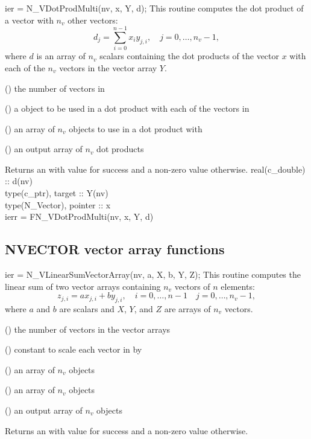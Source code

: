 {
  ier = N\_VDotProdMulti(nv, x, Y, d);
}
{
  This routine computes the dot product of a vector with $n_v$ other vectors:
  \begin{equation*}
    d_j = \sum_{i=0}^{n-1} x_i y_{j,i}, \quad j=0,\ldots,n_v-1,
  \end{equation*}
  where $d$ is an array of $n_v$ scalars containing the dot products of the
  vector $x$ with each of the $n_v$ vectors in the vector array $Y$.
}
{
  \begin{args}[nv]
  \item[nv] () the number of vectors in 
  \item[x] () a {\nvector} object to be used in a dot product
    with each of the vectors in 
  \item[Y] () an array of $n_v$ {\nvector} objects to use
    in a dot product with 
  \item[d] () an output array of $n_v$ dot products
  \end{args}
}
{
  Returns an  with value  for success and a non-zero value otherwise.
}
{}
{
  real(c\_double) :: d(nv)\\
  type(c\_ptr), target :: Y(nv)\\
  type(N\_Vector), pointer :: x\\
  ierr = FN\_VDotProdMulti(nv, x, Y, d)
}


\subsection{NVECTOR vector array functions}\label{ss:nvecarrayops}


{
  ier = N\_VLinearSumVectorArray(nv, a, X, b, Y, Z);
}
{
  This routine computes the linear sum of two vector arrays containing $n_v$
  vectors of $n$ elements:
  \begin{equation*}
    z_{j,i} = a x_{j,i} + b y_{j,i}, \quad i=0,\ldots,n-1 \quad j=0,\ldots,n_v-1,
  \end{equation*}
  where $a$ and $b$ are scalars and $X$, $Y$, and $Z$ are arrays of $n_v$ vectors.
}
{
  \begin{args}[nv]
  \item[nv] () the number of vectors in the vector arrays
  \item[a] () constant to scale each vector in  by
  \item[X] () an array of $n_v$ {\nvector} objects
  \item[Y] () an array of $n_v$ {\nvector} objects
  \item[Z] () an output array of $n_v$ {\nvector} objects
  \end{args}
}
{
  Returns an  with value  for success and a non-zero value otherwise.
}
{}

